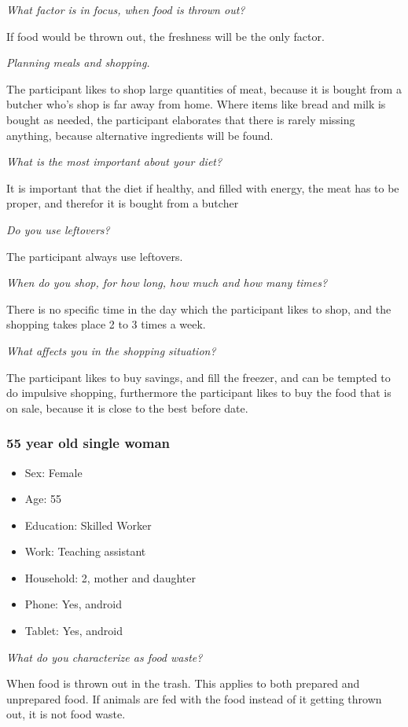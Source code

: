 \emph{What factor is in focus, when food is thrown out?}

If food would be thrown out, the freshness will be the only factor.

\emph{Planning meals and shopping.}

The participant likes to shop large quantities of meat, because it is bought from a butcher who's shop is far away from home. Where items like bread and milk is bought as needed, the participant elaborates that there is rarely missing anything, because alternative ingredients will be found.

\emph{What is the most important about your diet?}

It is important that the diet if healthy, and filled with energy, the meat has to be proper, and therefor it is bought from a butcher

\emph{Do you use leftovers?}

The participant always use leftovers.

\emph{When do you shop, for how long, how much and how many times?}

There is no specific time in the day which the participant likes to shop, and the shopping takes place 2 to 3 times a week.

\emph{What affects you in the shopping situation?}

The participant likes to buy savings, and fill the freezer, and can be tempted to do impulsive shopping, furthermore the participant likes to buy the food that is on sale, because it is close to the best before date.

\subsubsection{55 year old single woman}
\begin{itemize}
  \item Sex: Female
  \item Age: 55
  \item Education: Skilled Worker
  \item Work: Teaching assistant
  \item Household: 2, mother and daughter
  \item Phone: Yes, android
  \item Tablet: Yes, android
\end{itemize}

\emph{What do you characterize as food waste?}

When food is thrown out in the trash. This applies to both prepared and unprepared food. If animals are fed with the food instead of it getting thrown out, it is not food waste.

